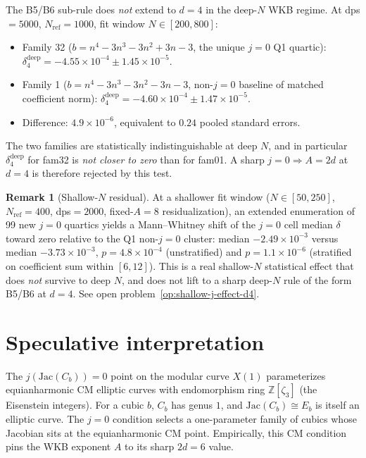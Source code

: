 \documentclass[11pt]{amsart}
\theoremstyle{plain}
\theoremstyle{definition}
\newtheorem{remark}{Remark}
\begin{document}
The B5/B6 sub-rule does \emph{not} extend to $d=4$ in the deep-$N$
WKB regime.  At dps$=5000$, $N_{\mathrm{ref}}=1000$, fit window
$N\in[200,800]$:
\begin{itemize}
  \item Family 32 ($b=n^4-3n^3-3n^2+3n-3$, the unique $j=0$
        Q1 quartic): $\delta_4^{\mathrm{deep}}=-4.55\times
        10^{-4}\pm 1.45\times 10^{-5}$.
  \item Family 1 ($b=n^4-3n^3-3n^2-3n-3$, non-$j=0$ baseline
        of matched coefficient norm):
        $\delta_4^{\mathrm{deep}}=-4.60\times 10^{-4}\pm
        1.47\times 10^{-5}$.
  \item Difference: $4.9\times 10^{-6}$, equivalent to
        $0.24$ pooled standard errors.
\end{itemize}
The two families are statistically indistinguishable at
deep $N$, and in particular $\delta_4^{\mathrm{deep}}$ for
fam32 is \emph{not closer to zero} than for fam01.  A sharp
$j=0\Rightarrow A=2d$ at $d=4$ is therefore rejected by this
test.

\begin{remark}[Shallow-$N$ residual]
At a shallower fit window ($N\in[50,250]$, $N_{\mathrm{ref}}=400$,
dps$=2000$, fixed-$A=8$ residualization), an extended
enumeration of 99 new $j=0$ quartics yields a Mann--Whitney
shift of the $j=0$ cell median $\delta$ toward zero relative
to the Q1 non-$j=0$ cluster: median $-2.49\times 10^{-3}$
versus median $-3.73\times 10^{-3}$, $p=4.8\times 10^{-4}$
(unstratified) and $p=1.1\times 10^{-6}$ (stratified on
coefficient sum within $[6,12]$).  This is a real shallow-$N$
statistical effect that does \emph{not} survive to deep $N$,
and does not lift to a sharp deep-$N$ rule of the form
B5/B6 at $d=4$.  See open problem~\ref{op:shallow-j-effect-d4}.
\end{remark}

\section{Speculative interpretation}

The $j(\mathrm{Jac}(C_b))=0$ point on the modular curve $X(1)$
parameterizes equianharmonic CM elliptic curves with
endomorphism ring $\mathbb{Z}[\zeta_3]$ (the Eisenstein
integers).  For a cubic $b$, $C_b$ has genus $1$, and
$\mathrm{Jac}(C_b)\cong E_b$ is itself an elliptic curve.  The
$j=0$ condition selects a one-parameter family of cubics whose
Jacobian sits at the equianharmonic CM point.  Empirically,
this CM condition pins the WKB exponent $A$ to its sharp
$2d=6$ value.
\end{document}

